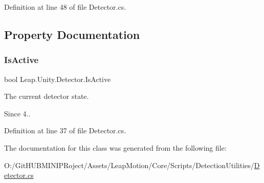 Definition at line 48 of file Detector.\+cs.



\subsection{Property Documentation}
\mbox{\label{class_leap_1_1_unity_1_1_detector_a89e15d17ea95587d9edf49c42473264d}} 
\subsubsection{\texorpdfstring{IsActive}{IsActive}}
{\footnotesize\ttfamily bool Leap.\+Unity.\+Detector.\+Is\+Active\hspace{0.3cm}{\ttfamily [get]}}

The current detector state. \begin{DoxySince}{Since}
4.. 
\end{DoxySince}


Definition at line 37 of file Detector.\+cs.



The documentation for this class was generated from the following file\+:\begin{DoxyCompactItemize}
\item 
O\+:/\+Git\+H\+U\+B\+M\+I\+N\+I\+P\+Roject/\+Assets/\+Leap\+Motion/\+Core/\+Scripts/\+Detection\+Utilities/\mbox{\hyperlink{_detector_8cs}{Detector.\+cs}}\end{DoxyCompactItemize}

